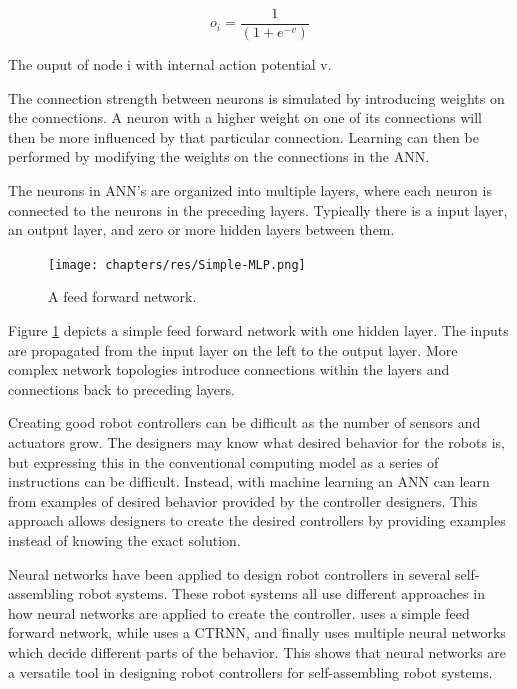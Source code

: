\begin{captioneq}[H]
	\begin{equation}
	o_i= \frac{1}{(1+e^{-v})}
	\label{eq:logistics-equation}
	\end{equation}
	
	\caption{The ouput of node i with internal action potential v.}
\end{captioneq}

The connection strength between neurons is simulated by introducing weights on the connections.
A neuron with a higher weight on one of its connections will then be more influenced by that particular connection.
Learning can then be performed by modifying the weights on the connections in the ANN.


The neurons in ANN's are organized into multiple layers, where each neuron is connected to the neurons in the preceding layers.
Typically there is a input layer, an output layer, and zero or more hidden layers between them.

\begin{figure}[H]
	\centering
	\texttt{[image: chapters/res/Simple-MLP.png]}
	\caption{A feed forward network.}
	\label{fig:mlp-simple}
\end{figure}

Figure \ref{fig:mlp-simple} depicts a simple feed forward network with one hidden layer.
The inputs are propagated from the input layer on the left to the output layer.
More complex network topologies introduce connections within the layers and connections back to preceding layers.

Creating good robot controllers can be difficult as the number of sensors and actuators grow.
The designers may know what desired behavior for the robots is, but expressing this in the conventional computing model as a series of instructions can be difficult.
Instead, with machine learning an ANN can learn from examples of desired behavior provided by the controller designers.
This approach allows designers to create the desired controllers by providing examples instead of knowing the exact solution.

Neural networks have been applied to design robot controllers in several\cite{trianni_evolving_2004}\cite{montanier_adaptive_2014}\cite{brandt_atron_2007} self-assembling robot systems.
These robot systems all use different approaches in how neural networks are applied to create the controller.
\cite{montanier_adaptive_2014} uses a simple feed forward network, while \cite{trianni_evolving_2004} uses a CTRNN, and finally \cite{brandt_atron_2007} uses multiple neural networks which decide different parts of the behavior.
This shows that neural networks are a versatile tool in designing robot controllers for self-assembling robot systems.

